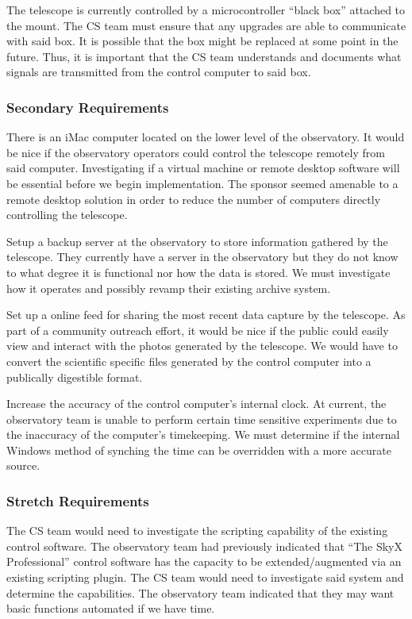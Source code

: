 \documentclass[12pt]{report}
\begin{document}
The telescope is currently controlled by a microcontroller “black box” attached to the mount. The CS team must ensure that any upgrades are able to communicate with said box. It is possible that the box might be replaced at some point in the future. Thus, it is important that the CS team understands and documents what signals are transmitted from the control computer to said box.

\subsubsection*{Secondary Requirements}

There is an iMac computer located on the lower level of the observatory. It would be nice if the observatory operators could control the telescope remotely from said computer. Investigating if a virtual machine or remote desktop software will be essential before we begin implementation. The sponsor seemed amenable to a remote desktop solution in order to reduce the number of computers directly controlling the telescope.

Setup a backup server at the observatory to store information gathered by the telescope. They currently have a server in the observatory but they do not know to what degree it is functional nor how the data is stored. We must investigate how it operates and possibly revamp their existing archive system.

Set up a online feed for sharing the most recent data capture by the telescope. As part of a community outreach effort, it would be nice if the public could easily view and interact with the photos generated by the telescope. We would have to convert the scientific specific files generated by the control computer into a publically digestible format.

Increase the accuracy of the control computer’s internal clock. At current, the observatory team is unable to perform certain time sensitive experiments due to the inaccuracy of the computer’s timekeeping. We must determine if the internal Windows method of synching the time can be overridden with a more accurate source.

\subsubsection*{Stretch Requirements}

The CS team would need to investigate the scripting capability of the existing control software. The observatory team had previously indicated that “The SkyX Professional” control software has the capacity to be extended/augmented via an existing scripting plugin. The CS team would need to investigate said system and determine the capabilities. The observatory team indicated that they may want basic functions automated if we have time.
\end{document}
